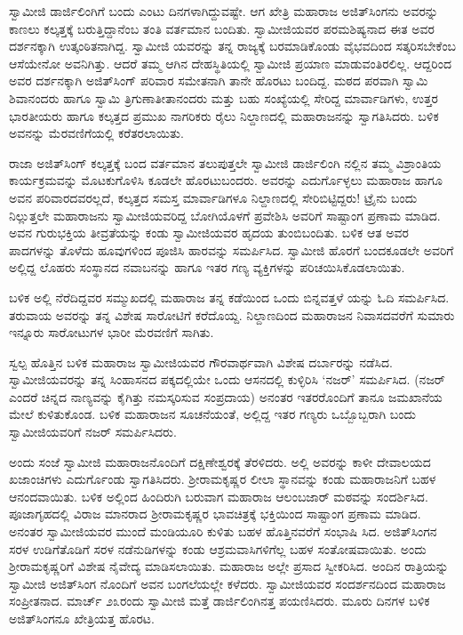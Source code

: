 ಸ್ವಾಮೀಜಿ ಡಾರ್ಜಿಲಿಂಗಿಗೆ ಬಂದು ಎಂಟು ದಿನಗಳಾಗಿದ್ದುವಷ್ಟೇ. ಆಗ ಖೇತ್ರಿ ಮಹಾರಾಜ ಅಜಿತ್​ಸಿಂಗನು ಅವರನ್ನು ಕಾಣಲು ಕಲ್ಕತ್ತಕ್ಕೆ ಬರುತ್ತಿದ್ದಾನೆಂಬ ತಂತಿ ವರ್ತಮಾನ ಬಂದಿತು. ಸ್ವಾಮೀಜಿಯವರ ಪರಮಶಿಷ್ಯನಾದ ಈತ ಅವರ ದರ್ಶನಕ್ಕಾಗಿ ಉತ್ಕಂಠಿತನಾಗಿದ್ದ. ಸ್ವಾಮೀಜಿ ಯವರನ್ನು ತನ್ನ ರಾಜ್ಯಕ್ಕೆ ಬರಮಾಡಿಕೊಂಡು ವೈಭವದಿಂದ ಸತ್ಕರಿಸಬೇಕೆಂಬ ಆಸೆಯೇನೋ ಅವನಿಗಿತ್ತು. ಆದರೆ ತಮ್ಮ ಆಗಿನ ದೇಹಸ್ಥಿತಿಯಲ್ಲಿ ಸ್ವಾಮೀಜಿ ಪ್ರಯಾಣ ಮಾಡುವಂತಿರಲಿಲ್ಲ. ಆದ್ದರಿಂದ ಅವರ ದರ್ಶನಕ್ಕಾಗಿ ಅಜಿತ್​ಸಿಂಗ್ ಪರಿವಾರ ಸಮೇತನಾಗಿ ತಾನೇ ಹೊರಟು ಬಂದಿದ್ದ. ಮಠದ ಪರವಾಗಿ ಸ್ವಾಮಿ ಶಿವಾನಂದರು ಹಾಗೂ ಸ್ವಾಮಿ ತ್ರಿಗುಣಾತೀತಾನಂದರು ಮತ್ತು ಬಹು ಸಂಖ್ಯೆಯಲ್ಲಿ ಸೇರಿದ್ದ ಮಾರ್ವಾಡಿಗಳು, ಉತ್ತರ ಭಾರತೀಯರು ಹಾಗೂ ಕಲ್ಕತ್ತದ ಪ್ರಮುಖ ನಾಗರಿಕರು ರೈಲು ನಿಲ್ದಾಣದಲ್ಲಿ ಮಹಾರಾಜನನ್ನು ಸ್ವಾಗತಿಸಿದರು. ಬಳಿಕ ಅವನನ್ನು ಮೆರವಣಿಗೆಯಲ್ಲಿ ಕರೆತರಲಾಯಿತು.

ರಾಜಾ ಅಜಿತ್​ಸಿಂಗ್ ಕಲ್ಕತ್ತಕ್ಕೆ ಬಂದ ವರ್ತಮಾನ ತಲುಪುತ್ತಲೇ ಸ್ವಾಮೀಜಿ ಡಾರ್ಜಿಲಿಂಗಿ ನಲ್ಲಿನ ತಮ್ಮ ವಿಶ್ರಾಂತಿಯ ಕಾರ್ಯಕ್ರಮವನ್ನು ಮೊಟಕುಗೊಳಿಸಿ ಕೂಡಲೇ ಹೊರಟುಬಂದರು. ಅವರನ್ನು ಎದುರ್ಗೊಳ್ಳಲು ಮಹಾರಾಜ ಹಾಗೂ ಅವನ ಪರಿವಾರದವರಲ್ಲದೆ, ಕಲ್ಕತ್ತದ ಸಮಸ್ತ ಮಾರ್ವಾಡಿಗಳೂ ನಿಲ್ದಾಣದಲ್ಲಿ ಸೇರಿಬಿಟ್ಟಿದ್ದರು! ಟ್ರೈನು ಬಂದು ನಿಲ್ಲುತ್ತಲೇ ಮಹಾರಾಜನು ಸ್ವಾಮೀಜಿಯವರಿದ್ದ ಬೋಗಿಯೊಳಗೆ ಪ್ರವೇಶಿಸಿ ಅವರಿಗೆ ಸಾಷ್ಟಾಂಗ ಪ್ರಣಾಮ ಮಾಡಿದ. ಅವನ ಗುರುಭಕ್ತಿಯ ತೀವ್ರತೆಯನ್ನು ಕಂಡು ಸ್ವಾಮೀಜಿಯವರ ಹೃದಯ ತುಂಬಿಬಂದಿತು. ಬಳಿಕ ಆತ ಅವರ ಪಾದಗಳನ್ನು ತೊಳೆದು ಹೂವುಗಳಿಂದ ಪೂಜಿಸಿ ಹಾರವನ್ನು ಸಮರ್ಪಿಸಿದ. ಸ್ವಾಮೀಜಿ ಹೊರಗೆ ಬಂದಕೂಡಲೇ ಅವರಿಗೆ ಅಲ್ಲಿದ್ದ ಲೊಹರು ಸಂಸ್ಥಾನದ ನವಾಬನನ್ನು ಹಾಗೂ ಇತರ ಗಣ್ಯ ವ್ಯಕ್ತಿಗಳನ್ನು ಪರಿಚಯಿಸಿಕೊಡಲಾಯಿತು.

ಬಳಿಕ ಅಲ್ಲಿ ನೆರೆದಿದ್ದವರ ಸಮ್ಮುಖದಲ್ಲಿ ಮಹಾರಾಜ ತನ್ನ ಕಡೆಯಿಂದ ಒಂದು ಬಿನ್ನವತ್ತಳೆ ಯನ್ನು ಓದಿ ಸಮರ್ಪಿಸಿದ. ತರುವಾಯ ಅವರನ್ನು ತನ್ನ ವಿಶೇಷ ಸಾರೋಟಿಗೆ ಕರೆದೊಯ್ದ. ನಿಲ್ದಾಣದಿಂದ ಮಹಾರಾಜನ ನಿವಾಸದವರೆಗೆ ಸುಮಾರು ಇನ್ನೂರು ಸಾರೋಟುಗಳ ಭಾರೀ ಮೆರವಣಿಗೆ ಸಾಗಿತು.

ಸ್ವಲ್ಪ ಹೊತ್ತಿನ ಬಳಿಕ ಮಹಾರಾಜ ಸ್ವಾಮೀಜಿಯವರ ಗೌರವಾರ್ಥವಾಗಿ ವಿಶೇಷ ದರ್ಬಾರನ್ನು ನಡೆಸಿದ. ಸ್ವಾಮೀಜಿಯವರನ್ನು ತನ್ನ ಸಿಂಹಾಸನದ ಪಕ್ಕದಲ್ಲಿಯೇ ಒಂದು ಆಸನದಲ್ಲಿ ಕುಳ್ಳಿರಿಸಿ ‘ನಜರ್​’ ಸಮರ್ಪಿಸಿದ. (ನಜರ್ ಎಂದರೆ ಚಿನ್ನದ ನಾಣ್ಯವನ್ನು ಕೈಗಿತ್ತು ನಮಸ್ಕರಿಸುವ ಸಂಪ್ರದಾಯ) ಅನಂತರ ಇತರರೊಂದಿಗೆ ತಾನೂ ಜಮಖಾನೆಯ ಮೇಲೆ ಕುಳಿತುಕೊಂಡ. ಬಳಿಕ ಮಹಾರಾಜನ ಸೂಚನೆಯಂತೆ, ಅಲ್ಲಿದ್ದ ಇತರ ಗಣ್ಯರು ಒಬ್ಬೊಬ್ಬರಾಗಿ ಬಂದು ಸ್ವಾಮೀಜಿಯವರಿಗೆ ನಜರ್ ಸಮರ್ಪಿಸಿದರು.

ಅಂದು ಸಂಜೆ ಸ್ವಾಮೀಜಿ ಮಹಾರಾಜನೊಂದಿಗೆ ದಕ್ಷಿಣೇಶ್ವರಕ್ಕೆ ತೆರಳಿದರು. ಅಲ್ಲಿ ಅವರನ್ನು ಕಾಳೀ ದೇವಾಲಯದ ಖಜಾಂಚಿಗಳು ಎದುರ್ಗೊಂಡು ಸ್ವಾಗತಿಸಿದರು. ಶ್ರೀರಾಮಕೃಷ್ಣರ ಲೀಲಾ ಸ್ಥಾನವನ್ನು ಕಂಡು ಮಹಾರಾಜನಿಗೆ ಬಹಳ ಆನಂದವಾಯಿತು. ಬಳಿಕ ಅಲ್ಲಿಂದ ಹಿಂದಿರುಗಿ ಬರುವಾಗ ಮಹಾರಾಜ ಆಲಂಬಜಾರ್ ಮಠವನ್ನು ಸಂದರ್ಶಿಸಿದ. ಪೂಜಾಗೃಹದಲ್ಲಿ ವಿರಾಜ ಮಾನರಾದ ಶ್ರೀರಾಮಕೃಷ್ಣರ ಭಾವಚಿತ್ರಕ್ಕೆ ಭಕ್ತಿಯಿಂದ ಸಾಷ್ಟಾಂಗ ಪ್ರಣಾಮ ಮಾಡಿದ. ಅನಂತರ ಸ್ವಾಮೀಜಿಯವರ ಮುಂದೆ ಮಂಡಿಯೂರಿ ಕುಳಿತು ಬಹಳ ಹೊತ್ತಿನವರೆಗೆ ಸಂಭಾಷಿ ಸಿದ. ಅಜಿತ್​ಸಿಂಗನ ಸರಳ ಉಡಿಗೆತೊಡಿಗೆ ಸರಳ ನಡೆನುಡಿಗಳನ್ನು ಕಂಡು ಆಶ್ರಮವಾಸಿಗಳಿಗೆಲ್ಲ ಬಹಳ ಸಂತೋಷವಾಯಿತು. ಅಂದು ಶ್ರೀರಾಮಕೃಷ್ಣರಿಗೆ ವಿಶೇಷ ನೈವೇದ್ಯ ಮಾಡಿಸಲಾಯಿತು. ಮಹಾರಾಜ ಅಲ್ಲೇ ಪ್ರಸಾದ ಸ್ವೀಕರಿಸಿದ. ಅಂದಿನ ರಾತ್ರಿಯನ್ನು ಸ್ವಾಮೀಜಿ ಅಜಿತ್​ಸಿಂಗ ನೊಂದಿಗೆ ಅವನ ಬಂಗಲೆಯಲ್ಲೇ ಕಳೆದರು. ಸ್ವಾಮೀಜಿಯವರ ಸಂದರ್ಶನದಿಂದ ಮಹಾರಾಜ ಸಂಪ್ರೀತನಾದ. ಮಾರ್ಚ್ ೨೩ರಂದು ಸ್ವಾಮೀಜಿ ಮತ್ತೆ ಡಾರ್ಜಿಲಿಂಗಿನತ್ತ ಪಯಣಿಸಿದರು. ಮೂರು ದಿನಗಳ ಬಳಿಕ ಅಜಿತ್​ಸಿಂಗನೂ ಖೇತ್ರಿಯತ್ತ ಹೊರಟ.

